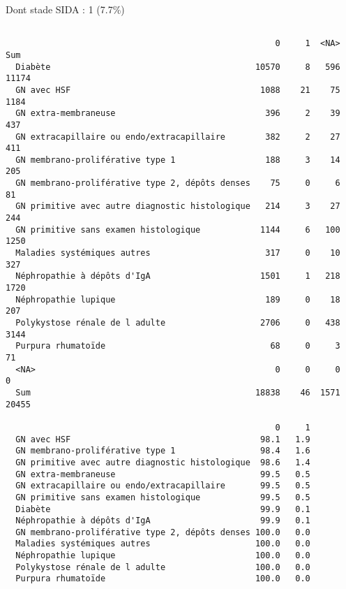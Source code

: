 \documentclass[11pt,a4paper]{article}\usepackage[]{graphicx}\usepackage[]{color}
\makeatletter
\newenvironment{kframe}{%
 \def\at@end@of@kframe{}%
 \ifinner\ifhmode%
  \def\at@end@of@kframe{\end{minipage}}%
  \begin{minipage}{\columnwidth}%
 \fi\fi%
 \def\FrameCommand##1{\hskip\@totalleftmargin \hskip-\fboxsep
 \colorbox{shadecolor}{##1}\hskip-\fboxsep
     \hskip-\linewidth \hskip-\@totalleftmargin \hskip\columnwidth}%
 \MakeFramed {\advance\hsize-\width
   \@totalleftmargin\z@ \linewidth\hsize
   \@setminipage}}%
 {\par\unskip\endMakeFramed%
 \at@end@of@kframe}
\newenvironment{knitrout}{}{} %
\makeatother
\begin{document}
Dont stade SIDA : 1 (7.7\%)
\begin{knitrout}
\color{fgcolor}\begin{kframe}
\begin{verbatim}
                                                 
                                                      0     1  <NA>   Sum
  Diabète                                         10570     8   596 11174
  GN avec HSF                                      1088    21    75  1184
  GN extra-membraneuse                              396     2    39   437
  GN extracapillaire ou endo/extracapillaire        382     2    27   411
  GN membrano-proliférative type 1                  188     3    14   205
  GN membrano-proliférative type 2, dépôts denses    75     0     6    81
  GN primitive avec autre diagnostic histologique   214     3    27   244
  GN primitive sans examen histologique            1144     6   100  1250
  Maladies systémiques autres                       317     0    10   327
  Néphropathie à dépôts d'IgA                      1501     1   218  1720
  Néphropathie lupique                              189     0    18   207
  Polykystose rénale de l adulte                   2706     0   438  3144
  Purpura rhumatoïde                                 68     0     3    71
  <NA>                                                0     0     0     0
  Sum                                             18838    46  1571 20455
                                                 
                                                      0     1
  GN avec HSF                                      98.1   1.9
  GN membrano-proliférative type 1                 98.4   1.6
  GN primitive avec autre diagnostic histologique  98.6   1.4
  GN extra-membraneuse                             99.5   0.5
  GN extracapillaire ou endo/extracapillaire       99.5   0.5
  GN primitive sans examen histologique            99.5   0.5
  Diabète                                          99.9   0.1
  Néphropathie à dépôts d'IgA                      99.9   0.1
  GN membrano-proliférative type 2, dépôts denses 100.0   0.0
  Maladies systémiques autres                     100.0   0.0
  Néphropathie lupique                            100.0   0.0
  Polykystose rénale de l adulte                  100.0   0.0
  Purpura rhumatoïde                              100.0   0.0
\end{verbatim}
\end{kframe}
\end{knitrout}
~\\
\end{document}
